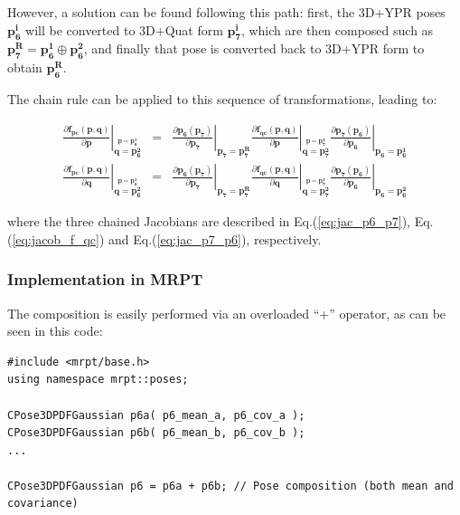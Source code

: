 \documentclass[a4paper,11pt]{report}
\begin{document}
However, a solution can be found following this path: first, 
the 3D+YPR poses $\mathbf{p_6^i}$ will be converted to 
3D+Quat form $\mathbf{p_7^i}$, which are then 
composed such as $\mathbf{p_7^R} = \mathbf{p_6^1} \oplus \mathbf{p_6^2}$, 
and finally that pose is converted back to 3D+YPR form to obtain  
$\mathbf{p_6^R}$. 

The chain rule can be applied to this sequence of transformations, leading to:

\begin{eqnarray}
 \left. 
\frac{\partial \mathbf{f_{pc}}(\mathbf{p},\mathbf{q}) }{\partial \mathbf{p}} \right|
 _{\overset{ \mathbf{p}=\mathbf{p_6^1} }{ \mathbf{q}=\mathbf{p_6^2} }}
&=&
 \left. 
\frac{\partial \mathbf{p_6} (\mathbf{p_7} ) }{\partial \mathbf{p_7}} 
\right|
 _{ \mathbf{p_7}=\mathbf{p_7^R} }
 \left. 
\frac{\partial \mathbf{f_{qc}} (\mathbf{p},\mathbf{q} ) }{\partial \mathbf{p}} 
\right|
 _{\overset{ \mathbf{p}=\mathbf{p_7^1} }{ \mathbf{q}=\mathbf{p_7^2} }}
 \left. 
\frac{\partial \mathbf{p_7} (\mathbf{p_6} ) }{\partial \mathbf{p_6}} 
\right|
 _{ \mathbf{p_6}=\mathbf{p_6^1} }
\\
 \left. 
\frac{\partial \mathbf{f_{pc}}(\mathbf{p},\mathbf{q}) }{\partial \mathbf{q}} \right|
 _{\overset{ \mathbf{p}=\mathbf{p_6^1} }{ \mathbf{q}=\mathbf{p_6^2} }}
&=&
 \left. 
\frac{\partial \mathbf{p_6} (\mathbf{p_7} ) }{\partial \mathbf{p_7}} 
\right|
 _{ \mathbf{p_7}=\mathbf{p_7^R} }
 \left. 
\frac{\partial \mathbf{f_{qc}} (\mathbf{p},\mathbf{q} ) }{\partial \mathbf{q}} 
\right|
 _{\overset{ \mathbf{p}=\mathbf{p_7^1} }{ \mathbf{q}=\mathbf{p_7^2} }}
 \left. 
\frac{\partial \mathbf{p_7} (\mathbf{p_6} ) }{\partial \mathbf{p_6}} 
\right|
 _{ \mathbf{p_6}=\mathbf{p_6^2} }
\end{eqnarray}

\noindent where the three chained Jacobians are described in 
Eq.(\ref{eq:jac_p6_p7}), Eq.(\ref{eq:jacob_f_qc}) and Eq.(\ref{eq:jac_p7_p6}), respectively.



\subsubsection{Implementation in MRPT}

The composition is easily performed via an overloaded ``+'' operator, as can be seen in this code:

\begin{lstlisting}
#include <mrpt/base.h> 
using namespace mrpt::poses; 

CPose3DPDFGaussian p6a( p6_mean_a, p6_cov_a ); 
CPose3DPDFGaussian p6b( p6_mean_b, p6_cov_b ); 
...

CPose3DPDFGaussian p6 = p6a + p6b; // Pose composition (both mean and covariance)
\end{lstlisting}
\end{document}
